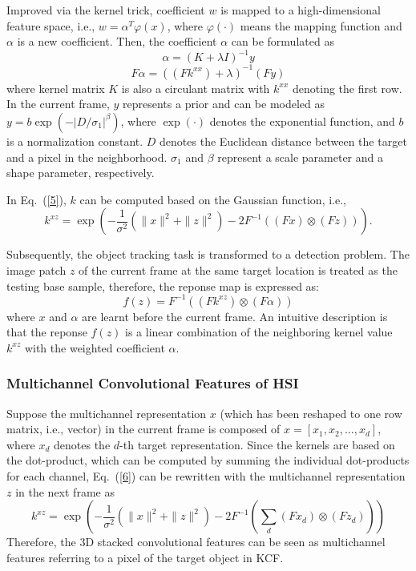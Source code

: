 \documentclass[runningheads,a4paper]{llncs}
\begin{document}
Improved via the kernel trick, coefficient $w$ is mapped to a high-dimensional feature space, i.e., $w=\alpha^T \varphi (x)$, where $\varphi(\cdot)$ means the mapping function and $\alpha$ is a new coefficient. Then, the coefficient $\alpha$ can be formulated as
\begin{equation}\label{4}
\alpha =(K+\lambda I)^{-1}y
\end{equation}
\begin{equation}\label{5}
F\alpha =((Fk^{xx})+\lambda)^{-1}(Fy)
\end{equation}
where kernel matrix $K$ is also a circulant matrix with $k^{xx}$ denoting the first row. In the current frame, $y$ represents a prior and can be modeled as $y=b\exp(-|D/\sigma_1|^{\beta})$, where $\exp(\cdot)$ denotes the exponential function, and $b$ is a normalization constant. $D$ denotes the Euclidean distance between the target and a pixel in the neighborhood. $\sigma_1$ and $\beta$ represent a scale parameter and a shape parameter, respectively.

In Eq.~(\ref{5}), $k$ can be computed based on the Gaussian function, i.e.,
\begin{equation}\label{6}
k^{xz}=\exp(-\frac{1}{\sigma^2}(\|x\|^2+\|z\|^2)-2F^{-1}((Fx) \otimes (Fz ))).
\end{equation}

Subsequently, the object tracking task is transformed to a detection problem. The image patch $z$ of the current frame at the same target location is treated as the testing base sample, therefore, the reponse map is expressed as:
\begin{equation}\label{7}
f(z)=F^{-1}((Fk^{xz})\otimes (F{\alpha}))
\end{equation}
where $x$ and $\alpha$ are learnt before the current frame. An intuitive description is that the reponse $f(z)$ is a linear combination of the neighboring kernel value $k^{xz}$ with the weighted coefficient $\alpha$.

\subsubsection{Multichannel Convolutional Features of HSI}
Suppose the multichannel representation $x$ (which has been reshaped to one row matrix, i.e., vector) in the current frame is composed of $x=[x_1,x_2,...,x_d]$, where $x_d$ denotes the $d$-th target representation. Since the kernels are based on the dot-product, which can be computed by summing the individual dot-products for each channel, Eq.~(\ref{6}) can be rewritten with the multichannel representation $z$ in the next frame as
\begin{equation}\label{8}
k^{xz}=\exp(-\frac{1}{\sigma^2}(\|x\|^2+\|z\|^2)-2F^{-1}(\sum_{d}(F{x_d}) \otimes (Fz_d)  ))
\end{equation}
Therefore, the 3D stacked convolutional features can be seen as multichannel features referring to a pixel of the target object in KCF.
\end{document}
